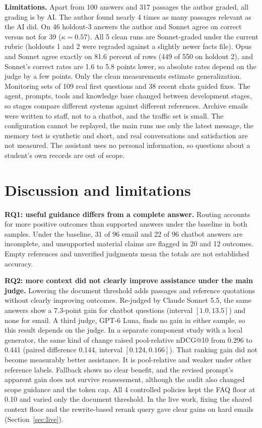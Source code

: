 \documentclass[a4paper,10pt,twocolumn]{article}
\begin{document}
\textbf{Limitations.} Apart from 100 answers and 317 passages the author graded, all grading is by AI. The author found nearly 4 times as many passages relevant as the AI did. On 46 holdout-3 answers the author and Sonnet agree on correct versus not for 39 ($\kappa=0.57$). All 5 clean runs are Sonnet-graded under the current rubric (holdouts 1 and 2 were regraded against a slightly newer facts file). Opus and Sonnet agree exactly on 81.6 percent of rows (449 of 550 on holdout 2), and Sonnet's correct rates are 1.6 to 5.8 points lower, so absolute rates depend on the judge by a few points. Only the clean measurements estimate generalization. Monitoring sets of 109 real first questions and 38 recent chats guided fixes. The agent, prompts, tools and knowledge base changed between development stages, so stages compare different systems against different references. Archive emails were written to staff, not to a chatbot, and the traffic set is small. The configuration cannot be replayed, the main runs use only the latest message, the memory test is synthetic and short, and real conversations and satisfaction are not measured. The assistant uses no personal information, so questions about a student's own records are out of scope.
\section{Discussion and limitations}
\textbf{RQ1: useful guidance differs from a complete answer.} Routing accounts for more positive outcomes than supported answers under the baseline in both samples. Under the baseline, 31 of 96 email and 22 of 96 chatbot answers are incomplete, and unsupported material claims are flagged in 20 and 12 outcomes. Empty references and unverified judgments mean the totals are not established accuracy.

\textbf{RQ2: more context did not clearly improve assistance under the main judge.} Lowering the document threshold adds passages and reference quotations without clearly improving outcomes. Re-judged by Claude Sonnet 5.5, the same answers show a 7.3-point gain for chatbot questions (interval $[1.0,13.5]$) and none for email. A third judge, GPT-6 Luna, finds no gain in either sample, so this result depends on the judge. In a separate component study with a local generator, the same kind of change raised pool-relative nDCG@10 from 0.296 to 0.441 (paired difference 0.144, interval $[0.124,0.166]$). That ranking gain did not become measurably better assistance. It is pool-relative and weaker under other reference labels. Fallback shows no clear benefit, and the revised prompt's apparent gain does not survive reassessment, although the audit also changed scope guidance and the token cap. All 4 controlled policies kept the FAQ floor at 0.10 and varied only the document threshold. In the live work, fixing the shared context floor and the rewrite-based rerank query gave clear gains on hard emails (Section~\ref{sec:live}).
\end{document}
